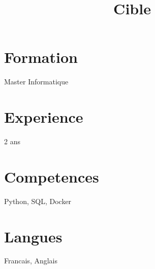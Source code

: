 \documentclass[11pt,a4paper]{moderncv}
\title{Cible}
\begin{document}
\makecvtitle

\section{Formation}
Master Informatique

\section{Experience}
2 ans

\section{Competences}
Python, SQL, Docker

\section{Langues}
Francais, Anglais
\end{document}
